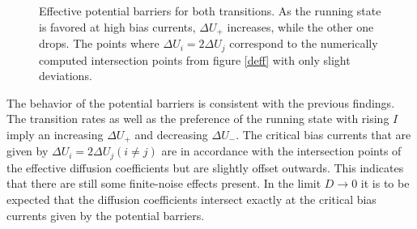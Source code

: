 \documentclass[12pt,a4paper]{article}
\begin{document}
\begin{figure}[H]
\hspace*{-0.5cm}
\caption{Effective potential barriers for both transitions. As the running state is favored at high bias currents, $\Delta U_+$ increases, while the other one drops. The points where $\Delta U_i=2\Delta U_j$ correspond to the numerically computed intersection points from figure \ref{deff} with only slight deviations.}
\end{figure}
The behavior of the potential barriers is consistent with the previous findings. The transition rates as well as the preference of the running state with rising $I$ imply an increasing $\Delta U_+$ and decreasing $\Delta U_-$. The critical bias currents that are given by $\Delta U_i=2\Delta U_j (i\neq j)$ are in accordance with the intersection points of the effective diffusion coefficients but are slightly offset outwards. This indicates that there are still some finite-noise effects present. In the limit $D\rightarrow 0$ it is to be expected that the diffusion coefficients intersect exactly at the critical bias currents given by the potential barriers.
\end{document}

